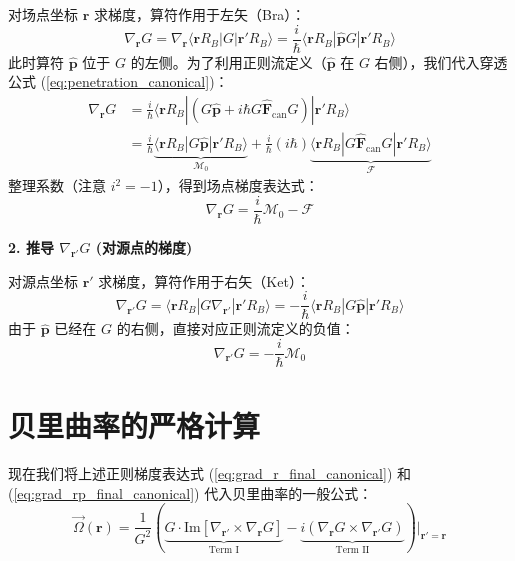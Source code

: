 \documentclass[a4paper,12pt]{article}
\begin{document}
对场点坐标 $\mathbf{r}$ 求梯度，算符作用于左矢（Bra）：
\begin{equation}
    \nabla_{\mathbf{r}} G = \nabla_{\mathbf{r}} \langle \mathbf{r} R_B | G | \mathbf{r}' R_B \rangle = \frac{i}{\hbar} \langle \mathbf{r} R_B | \hat{\mathbf{p}} G | \mathbf{r}' R_B \rangle
\end{equation}
此时算符 $\hat{\mathbf{p}}$ 位于 $G$ 的左侧。为了利用正则流定义（$\hat{\mathbf{p}}$ 在 $G$ 右侧），我们代入穿透公式 (\ref{eq:penetration_canonical})：
\begin{align}
    \nabla_{\mathbf{r}} G &= \frac{i}{\hbar} \langle \mathbf{r} R_B | (G \hat{\mathbf{p}} + i\hbar G \hat{\mathbf{F}}_{\text{can}} G) | \mathbf{r}' R_B \rangle \nonumber \\
    &= \frac{i}{\hbar} \underbrace{\langle \mathbf{r} R_B | G \hat{\mathbf{p}} | \mathbf{r}' R_B \rangle}_{\boldsymbol{\mathcal{M}}_0} + \frac{i}{\hbar}(i\hbar) \underbrace{\langle \mathbf{r} R_B | G \hat{\mathbf{F}}_{\text{can}} G | \mathbf{r}' R_B \rangle}_{\boldsymbol{\mathcal{F}}}
\end{align}
整理系数（注意 $i^2 = -1$），得到场点梯度表达式：
\begin{equation}
    \nabla_{\mathbf{r}} G = \frac{i}{\hbar} \boldsymbol{\mathcal{M}}_0 - \boldsymbol{\mathcal{F}}
    \label{eq:grad_r_final_canonical}
\end{equation}

\textbf{2. 推导 $\nabla_{\mathbf{r}'} G$ (对源点的梯度)}

对源点坐标 $\mathbf{r}'$ 求梯度，算符作用于右矢（Ket）：
\begin{equation}
    \nabla_{\mathbf{r}'} G = \langle \mathbf{r} R_B | G \nabla_{\mathbf{r}'} | \mathbf{r}' R_B \rangle 
    = -\frac{i}{\hbar} \langle \mathbf{r} R_B | G \hat{\mathbf{p}} | \mathbf{r}' R_B \rangle
\end{equation}
由于 $\hat{\mathbf{p}}$ 已经在 $G$ 的右侧，直接对应正则流定义的负值：
\begin{equation}
    \nabla_{\mathbf{r}'} G = -\frac{i}{\hbar} \boldsymbol{\mathcal{M}}_0
    \label{eq:grad_rp_final_canonical}
\end{equation}

\section{贝里曲率的严格计算}

现在我们将上述正则梯度表达式 (\ref{eq:grad_r_final_canonical}) 和 (\ref{eq:grad_rp_final_canonical}) 代入贝里曲率的一般公式：
\begin{equation}
    \vec{\Omega}(\mathbf{r}) = \frac{1}{G^2} \left( \underbrace{G \cdot \text{Im}[\nabla_{\mathbf{r}'} \times \nabla_{\mathbf{r}} G]}_{\text{Term I}} - \underbrace{i (\nabla_{\mathbf{r}} G \times \nabla_{\mathbf{r}'} G)}_{\text{Term II}} \right) \Bigg|_{\mathbf{r}'=\mathbf{r}}
\end{equation}
\end{document}
